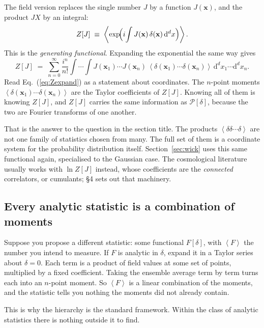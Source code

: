 \documentclass[12pt]{article}
\newcommand{\bx}{\mathbf{x}}
\newcommand{\avg}[1]{\left\langle #1 \right\rangle}
\begin{document}
The field version replaces the single number $J$ by a function
$J(\bx)$, and the product $JX$ by an integral:
\begin{equation}
  Z[J] \;\equiv\;
  \avg{\exp\!\Bigl(i\!\int J(\bx)\,\delta(\bx)\,\mathrm d^d x\Bigr)} .
  \label{eq:Zgeneral}
\end{equation}
This is the \emph{generating functional}.  Expanding the exponential the
same way gives
\begin{equation}
  Z[J] \;=\; \sum_{n=0}^{\infty} \frac{i^n}{n!}
  \int\!\!\cdots\!\!\int
  J(\bx_1)\cdots J(\bx_n)\,
  \avg{\delta(\bx_1)\cdots\delta(\bx_n)}\,
  \mathrm d^d x_1 \cdots \mathrm d^d x_n .
  \label{eq:Zexpand}
\end{equation}
Read Eq.~(\ref{eq:Zexpand}) as a statement about coordinates.  The
$n$-point moments $\avg{\delta(\bx_1)\cdots\delta(\bx_n)}$ are the
Taylor coefficients of $Z[J]$.  Knowing all of them is knowing $Z[J]$,
and $Z[J]$ carries the same information as $\mathcal P[\delta]$, because
the two are Fourier transforms of one another.

That is the answer to the question in the section title.  The products
$\avg{\delta\delta\cdots\delta}$ are not one family of statistics chosen
from many.  The full set of them is a coordinate system for the
probability distribution itself.  Section~\ref{sec:wick} uses this same
functional again, specialised to the Gaussian case.  The cosmological
literature usually works with $\ln Z[J]$ instead, whose coefficients are
the \emph{connected} correlators, or cumulants; \citet{Bernardeau2002}
\S4 sets out that machinery.

\subsection{Every analytic statistic is a combination of moments}
\label{sec:analytic}

Suppose you propose a different statistic: some functional $F[\delta]$,
with $\avg{F}$ the number you intend to measure.  If $F$ is analytic in
$\delta$, expand it in a Taylor series about $\delta = 0$.  Each term is
a product of field values at some set of points, multiplied by a fixed
coefficient.  Taking the ensemble average term by term turns each into
an $n$-point moment.  So $\avg{F}$ is a linear combination of the
moments, and the statistic tells you nothing the moments did not already
contain.

This is why the hierarchy is the standard framework.  Within the class of
analytic statistics there is nothing outside it to find.
\end{document}
